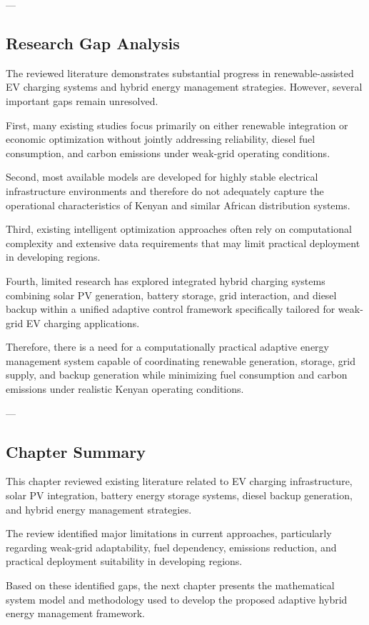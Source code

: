---

\subsection{Research Gap Analysis}

The reviewed literature demonstrates substantial progress in renewable-assisted EV charging systems and hybrid energy management strategies. However, several important gaps remain unresolved.

First, many existing studies focus primarily on either renewable integration or economic optimization without jointly addressing reliability, diesel fuel consumption, and carbon emissions under weak-grid operating conditions.

Second, most available models are developed for highly stable electrical infrastructure environments and therefore do not adequately capture the operational characteristics of Kenyan and similar African distribution systems.

Third, existing intelligent optimization approaches often rely on computational complexity and extensive data requirements that may limit practical deployment in developing regions.

Fourth, limited research has explored integrated hybrid charging systems combining solar PV generation, battery storage, grid interaction, and diesel backup within a unified adaptive control framework specifically tailored for weak-grid EV charging applications.

Therefore, there is a need for a computationally practical adaptive energy management system capable of coordinating renewable generation, storage, grid supply, and backup generation while minimizing fuel consumption and carbon emissions under realistic Kenyan operating conditions.

---

\subsection{Chapter Summary}

This chapter reviewed existing literature related to EV charging infrastructure, solar PV integration, battery energy storage systems, diesel backup generation, and hybrid energy management strategies.

The review identified major limitations in current approaches, particularly regarding weak-grid adaptability, fuel dependency, emissions reduction, and practical deployment suitability in developing regions.

Based on these identified gaps, the next chapter presents the mathematical system model and methodology used to develop the proposed adaptive hybrid energy management framework.